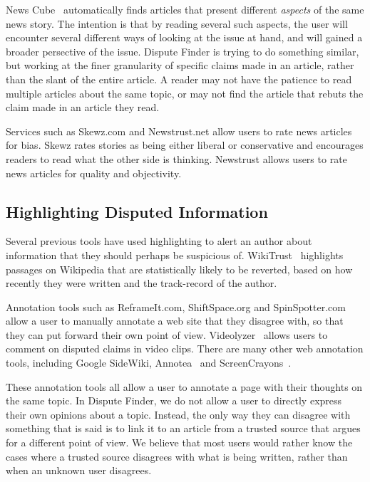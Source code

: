 \documentclass{www2010-submission}
\begin{document}
News Cube~\cite{Park2009} automatically finds articles that present different {\it aspects} of the same news story. The intention is that by reading several such aspects, the user will encounter several different ways of looking at the issue at hand, and will gained a broader persective of the issue. Dispute Finder is trying to do something similar, but working at the finer granularity of specific claims made in an article, rather than the slant of the entire article. A reader may not have the patience to read multiple articles about the same topic, or may not find the article that rebuts the claim made in an article they read. 

Services such as Skewz.com and Newstrust.net allow users to rate news articles for bias. Skewz rates stories as being either liberal or conservative and encourages readers to read what the other side is thinking. Newstrust allows users to rate news articles for quality and objectivity. 


\subsection{Highlighting Disputed Information}

Several previous tools have used highlighting to alert an author about information that they should perhaps be suspicious of. WikiTrust~\cite{Adler2008a} highlights passages on Wikipedia that are statistically likely to be reverted, based on how recently they were written and the track-record of the author. 

Annotation tools such as ReframeIt.com, ShiftSpace.org and SpinSpotter.com allow a user to manually annotate a web site that they disagree with, so that they can put forward their own point of view. Videolyzer~\cite{Diakopoulos2008} allows users to comment on disputed claims in video clips. There are many other web annotation tools, including Google SideWiki, Annotea~\cite{Koivunen2001} and ScreenCrayons~\cite{Olsen2004}. 

These annotation tools all allow a user to annotate a page with their thoughts on the same topic. In Dispute Finder, we do not allow a user to directly express their own opinions about a topic. Instead, the only way they can disagree with something that is said is to link it to an article from a trusted source that argues for a different point of view. We believe that most users would rather know the cases where a trusted source disagrees with what is being written, rather than when an unknown user disagrees.
\end{document}
